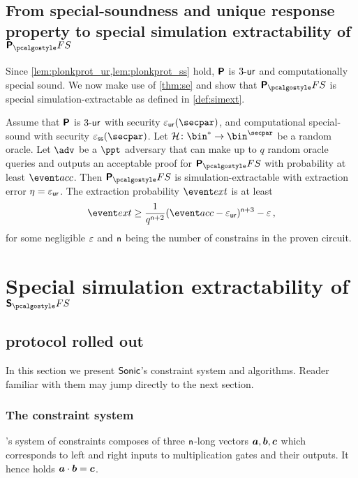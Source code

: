 \documentclass[runningheads,11pt]{llncs}
\begin{document}
\subsection{From special-soundness and unique response property to special simulation
  extractability of $\plonkprotfs$}

Since \cref{lem:plonkprot_ur,lem:plonkprot_ss} hold, $\bm{\mathsf{P}}$ is ${3\text{-}\mathsf{ur}}$
and computationally special sound. We now 
make use of \cref{thm:se} and show that
$\plonkprot_\fs$ is special simulation-extractable as defined in \cref{def:simext}.

\begin{corollary}
\label{thm:plonkprotfs_se}
Assume that $\bm{\mathsf{P}}$ is ${3\text{-}\mathsf{ur}}$ with security $\epsur(\secpar)$, and
computational special-sound with security $\epsss(\secpar)$. Let $\ro\colon
\bin^* \to \bin^\secpar$ be a random oracle. Let $\advse$ be a $\ppt$ adversary
that can make up to $q$ random oracle queries and outputs an acceptable proof
for $\plonkprotfs$ with probability at least $\accProb$. Then $\plonkprotfs$ is
simulation-extractable with extraction error $\eta = \varepsilon_{\mathsf{ur}}$. The extraction
probability $\extProb$ is at least
\[
	\extProb \geq \frac{1}{q^{\noofc + 2}} (\accProb - \epsur)^{\noofc + 3} -\eps\,,
\]
for some negligible $\varepsilon$ and $\mathsf{n}$ being the number of
constrains in the proven circuit.
\end{corollary}

\section{Special simulation extractability of $\sonicprotfs$}
\label{sec:sonic}
\subsection{\sonic{} protocol rolled out}
In this section we present ${\textnormal{\textsf{Sonic}}}$'s constraint system and algorithms. Reader
familiar with them may jump directly to the next section.

\subsubsection{The constraint system}
\label{sec:sonic_constraint_system}
\sonic's system of constraints composes of three $\mathsf{n}$-long vectors
$\va, \vb, \vc$ which corresponds to left and right inputs to multiplication
gates and their outputs. It hence holds $\va \cdot \vb = \vc$.
\end{document}
